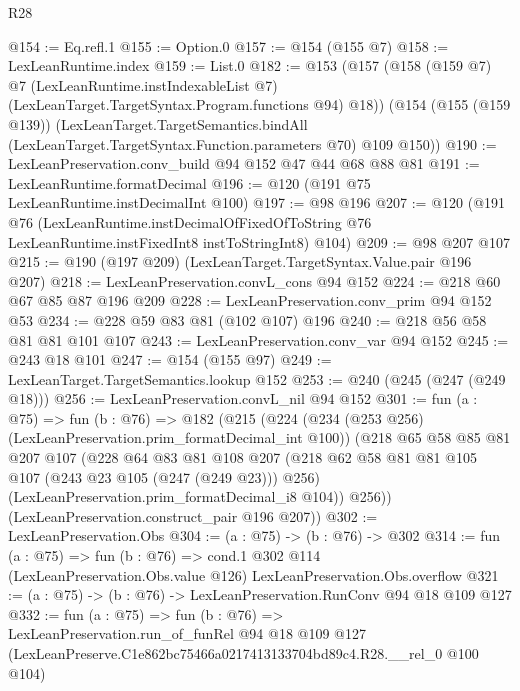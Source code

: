 \begin{lexlean}{R28}
\begin{coremodule}
@154 := Eq.refl.{1}
@155 := Option.{0}
@157 := @154 (@155 @7)
@158 := LexLeanRuntime.index
@159 := List.{0}
@182 := @153
    (@157
      (@158
        (@159 @7)
        @7
        (LexLeanRuntime.instIndexableList @7)
        (LexLeanTarget.TargetSyntax.Program.functions @94)
        @18))
    (@154
      (@155 (@159 @139))
      (LexLeanTarget.TargetSemantics.bindAll
        (LexLeanTarget.TargetSyntax.Function.parameters @70)
        @109
        @150))
@190 := LexLeanPreservation.conv_build @94 @152 @47 @44 @68 @88 @81
@191 := LexLeanRuntime.formatDecimal
@196 := @120 (@191 @75 LexLeanRuntime.instDecimalInt @100)
@197 := @98 @196
@207 := @120
    (@191
      @76
      (LexLeanRuntime.instDecimalOfFixedOfToString
        @76
        LexLeanRuntime.instFixedInt8
        instToStringInt8)
      @104)
@209 := @98 @207 @107
@215 := @190 (@197 @209) (LexLeanTarget.TargetSyntax.Value.pair @196 @207)
@218 := LexLeanPreservation.convL_cons @94 @152
@224 := @218 @60 @67 @85 @87 @196 @209
@228 := LexLeanPreservation.conv_prim @94 @152 @53
@234 := @228 @59 @83 @81 (@102 @107) @196
@240 := @218 @56 @58 @81 @81 @101 @107
@243 := LexLeanPreservation.conv_var @94 @152
@245 := @243 @18 @101
@247 := @154 (@155 @97)
@249 := LexLeanTarget.TargetSemantics.lookup @152
@253 := @240 (@245 (@247 (@249 @18)))
@256 := LexLeanPreservation.convL_nil @94 @152
@301 := fun (a : @75) =>
  fun (b : @76) =>
  @182
    (@215
      (@224
        (@234 (@253 @256) (LexLeanPreservation.prim_formatDecimal_int @100))
        (@218
          @65
          @58
          @85
          @81
          @207
          @107
          (@228
            @64
            @83
            @81
            @108
            @207
            (@218 @62 @58 @81 @81 @105 @107 (@243 @23 @105 (@247 (@249 @23))) @256)
            (LexLeanPreservation.prim_formatDecimal_i8 @104))
          @256))
      (LexLeanPreservation.construct_pair @196 @207))
@302 := LexLeanPreservation.Obs
@304 := (a : @75) -> (b : @76) -> @302
@314 := fun (a : @75) =>
  fun (b : @76) =>
  cond.{1} @302 @114 (LexLeanPreservation.Obs.value @126) LexLeanPreservation.Obs.overflow
@321 := (a : @75) -> (b : @76) -> LexLeanPreservation.RunConv @94 @18 @109 @127
@332 := fun (a : @75) =>
  fun (b : @76) =>
  LexLeanPreservation.run_of_funRel
    @94
    @18
    @109
    @127
    (LexLeanPreserve.C1e862bc75466a0217413133704bd89c4.R28.__rel_0 @100 @104)
\end{coremodule}
\end{lexlean}
